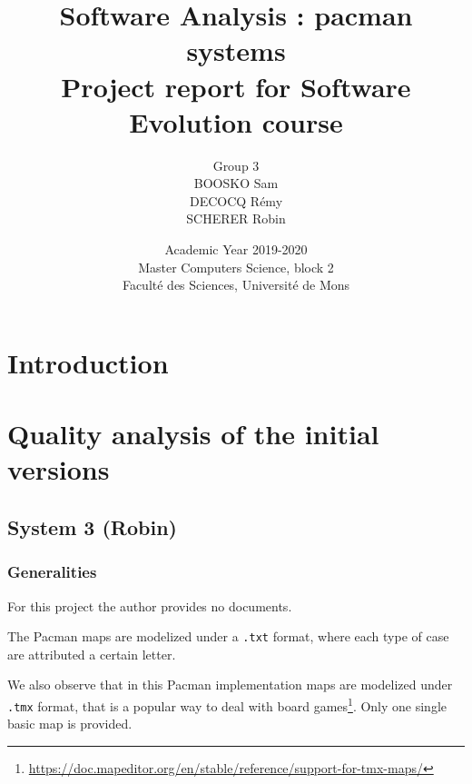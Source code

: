 \documentclass[]{article}
\begin{document}
\title{
\vspace{1.6cm}
{\Huge Software Analysis : pacman systems}\\
\vspace{0.5cm}
{\Huge Project report for Software Evolution course}\vspace{1cm}\\
}


\author{
\vspace{1cm}
\huge{Group 3}\\
\Large{BOOSKO Sam}\\
\Large{DECOCQ Rémy}\\
\Large{SCHERER Robin}
}


\date{
\vspace{7.9cm}
Academic Year 2019-2020\\
Master Computers Science, block 2\\
Faculté des Sciences, Université de Mons}

\maketitle          

\thispagestyle{empty}   

\newpage

\tableofcontents
\newpage

\section*{Introduction}
\newpage
\section{Quality analysis of the initial versions}

\subsection{System 3 (Robin)}
\subsubsection{Generalities}

For this project the author provides no documents.

The Pacman maps are modelized under a \texttt{.txt} format, where each type of case are attributed a certain letter. 

We also observe that in this Pacman implementation maps are modelized under \texttt{.tmx} format, that is a popular way to deal with board games\footnote{\url{https://doc.mapeditor.org/en/stable/reference/support-for-tmx-maps/}}. Only one single basic map is provided.\\
\end{document}
